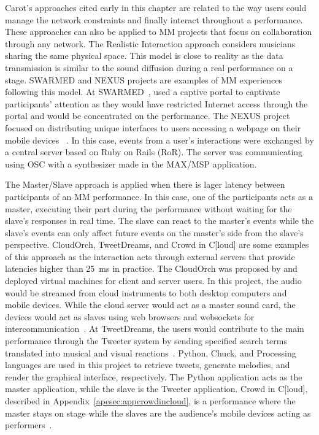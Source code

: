 
Carot's approaches cited early in this chapter are related to the way users could manage the network constraints and finally interact throughout a performance.
These approaches can also be applied to MM projects that focus on collaboration through any network.
The Realistic Interaction approach considers musicians sharing the same physical space.
This model is close to reality as the data transmission is similar to the sound diffusion during a real performance on a stage.
SWARMED and NEXUS projects are examples of MM experiences following this model.
At SWARMED~\citep{Hindle2013swarmed},  used a captive portal to captivate participants' attention as they would have restricted Internet access through the portal and would be concentrated on the performance.
The NEXUS project focused on distributing unique interfaces to users accessing a webpage on their mobile devices~
\citep{Allison2013nexus}.
In this case, events from a user's interactions were exchanged by a central server based on Ruby on Rails (RoR).
The server was communicating using OSC with a synthesizer made in the MAX/MSP application.

The Master/Slave approach is applied when there is lager latency between participants of an MM performance.
In this case, one of the participants acts as a master, executing their part during the performance without waiting for the slave's responses in real time.
The slave can react to the master's events while the slave's events can only affect future events on the master's side from the slave's perspective.
CloudOrch, TweetDreams, and Crowd in C[loud] are some examples of this approach as the interaction acts through external servers that provide latencies higher than 25~ms in practice.
The CloudOrch was proposed by  and deployed virtual machines for client and server users.
In this project, the audio would be streamed from cloud instruments to both desktop computers and mobile devices.
While the cloud server would act as a master sound card, the devices would act as slaves using web browsers and websockets for intercommunication~\citep{Hindle2014cloudorch}.
At TweetDreams, the users would contribute to the main performance through the Tweeter system by sending specified search terms translated into musical and visual reactions~\citep{Dahl2011tweetdreams}.
Python, Chuck, and Processing languages are used in this project to retrieve tweets, generate melodies, and render the graphical interface, respectively.
The Python application acts as the master application, while the slave is the Tweeter application.
Crowd in C[loud], described in Appendix~\ref{apesec:appcrowdincloud}, is a performance where the master stays on stage while the slaves are the audience's mobile devices acting as performers~\citep{Lee2016crowd,deCarvalhoJunior2016understanding}.

